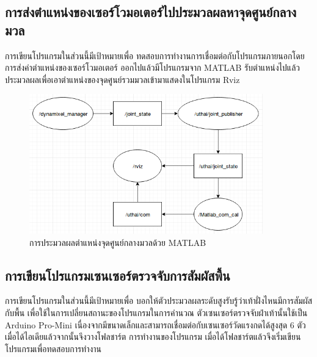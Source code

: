 \subsection{การส่งตำแหน่งของเซอร์โวมอเตอร์ไปประมวลผลหาจุดศูนย์กลางมวล}
การเขียนโปรแกรมในส่วนนี้มีเป้าหมายเพื่อ ทดสอบการทำงานการเชื่อมต่อกับโปรแกรมภายนอกโดยการส่งค่าตำแหน่งของเซอร์โวมอเตอร์
ออกไปแล้วมีโปรแกรมจาก MATLAB รับตำแหน่งไปแล้วประมวลผลเพื่อเอาตำแหน่งของจุดศูนย์รวมมวลเข้ามาแสดงในโปรแกรม Rviz
\begin{figure}[!ht]
	\centering
	\includegraphics[width=0.9\textwidth]{chapter3/images/matlab_com.png}
	\caption{การประมวลผลตำแหน่งจุดศูนย์กลางมวลด้วย MATLAB}
\end{figure}


\clearpage
\subsection{การเขียนโปรแกรมเซนเซอร์ตรวจจับการสัมผัสพื้น}
การเขียนโปรแกรมในส่วนนี้มีเป้าหมายเพื่อ บอกให้ตัวประมวลผลระดับสูงรับรู้ว่าเท้าฝั่งไหนมีการสัมผัสกับพื้น
เพื่อใช้ในการเปลี่ยนสถานะของโปรแกรมในการคำนวณ ตัวเซนเซอร์ตรวจจับฝ่าเท้านั้นใช้เป็น Arduino Pro-Mini
เนื่องจากมีขนาดเล็กและสามารถเชื่อมต่อกับเซนเซอร์วัดแรงกดได้สูงสุด 6 ตัว เมื่อได้ไอเดียแล้วจากนั้นจึงวางโฟลชาร์ต
การทำงานของโปรแกรม เมื่อได้โฟลชาร์ตแล้วจึงเริ่มเขียนโปรแกรมเพื่อทดสอบการทำงาน

